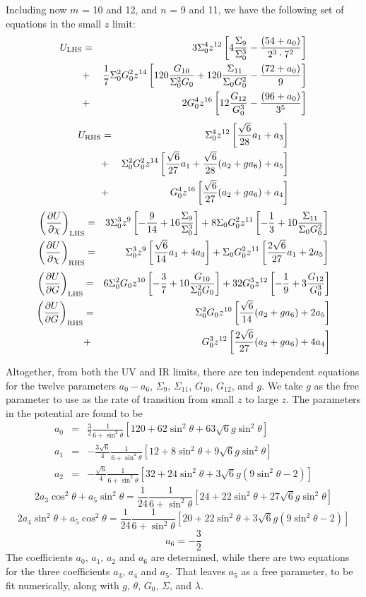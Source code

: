 \documentclass[aps,prd,12pt,nofootinbib]{revtex4}
\newcommand{\be}{\begin{equation}}
\newcommand{\ee}{\end{equation}}
\newcommand{\ba}{\begin{eqnarray}}
\newcommand{\ea}{\end{eqnarray}}
\def\rt6{\sqrt{6}}
\begin{document}
Including now $m$ = 10 and 12, and $n$ = 9 and 11, we have the following set of equations in the small $z$ limit:
\ba
U_{\rm LHS} &=& 3 \Sigma_0^4 z^{12} \left[ 4 \frac{\Sigma_9}{\Sigma_0^3} - \frac{(54+a_0)}{2^3 \cdot 7^2} \right] \nonumber \\
&+& \frac{1}{7} \Sigma_0^2 G_0^2 z^{14} \left[ 120 \frac{G_{10}}{\Sigma_0^2 G_0} + 120 \frac{\Sigma_{11}}{\Sigma_0 G_0^2} - \frac{(72+a_0)}{9} \right] \nonumber \\
&+& 2G_0^4 z^{16} \left[ 12 \frac{G_{12}}{G_0^3} - \frac{(96+a_0)}{3^5} \right]
\ea
\ba
U_{\rm RHS} &=& \Sigma_0^4 z^{12} \left[  \frac{\rt6}{28} a_1 + a_3\right] \nonumber \\
&+& \Sigma_0^2 G_0^2 z^{14} \left[ \frac{\rt6}{27} a_1 + \frac{\rt6}{28} (a_2 + g a_6) + a_5 \right] \nonumber \\
&+& G_0^4 z^{16} \left[ \frac{\rt6}{27} (a_2 + g a_6) + a_4 \right]
\ea
\ba
\left(\frac{\partial U}{\partial \chi}\right)_{\rm LHS} &=& 3 \Sigma_0^3 z^9 \left[ -\frac{9}{14} + 16 \frac{\Sigma_9}{\Sigma_0^3} \right]+ 8 \Sigma_0 G_0^2 z^{11} \left[ - \frac{1}{3} + 10 \frac{\Sigma_{11}}{\Sigma_0 G_0^2} \right]\\
\left(\frac{\partial U}{\partial \chi}\right)_{\rm RHS} &=& \Sigma_0^3 z^9 \left[ \frac{\rt6}{14} a_1 + 4 a_3  \right]+ \Sigma_0 G_0^2 z^{11} \left[  \frac{2\rt6}{27} a_1 + 2 a_5 \right]
\ea
\ba
\left(\frac{\partial U}{\partial G}\right)_{\rm LHS} &=& 6 \Sigma_0^2 G_0 z^{10} \left[ -\frac{3}{7} + 10 \frac{G_{10}}{\Sigma_0^2 G_0} \right]
+ 32 G_0^3 z^{12} \left[ - \frac{1}{9} + 3 \frac{G_{12}}{G_0^3} \right] \\
\left(\frac{\partial U}{\partial G}\right)_{\rm RHS} &=& \Sigma_0^2 G_0 z^{10} \left[ \frac{\rt6}{14} (a_2 + g a_6) + 2a_5 \right] \\
&+& G_0^3 z^{12} \left[ \frac{2\rt6}{27}  (a_2 + g a_6) + 4a_4 \right]
\ea

Altogether, from both the UV and IR limits, there are ten independent equations for the twelve parameters $a_0 - a_6$, $\Sigma_9$, $\Sigma_{11}$, $G_{10}$, $G_{12}$, and $g$.  
We take $g$ as the free parameter to use as the rate of transition from small $z$ to large $z$.  
The parameters in the potential are found to be
\ba
a_0 &=&  \frac{3}{2} \frac{1}{6 + \sin^2 \theta}\left[ 120 + 62 \sin^2 \theta + 63 \rt6 g \sin^2 \theta \right] \\
a_1 &=&  -\frac{3\rt6}{4} \frac{1}{6 + \sin^2 \theta}\left[ 12 + 8 \sin^2 \theta + 9 \rt6 g \sin^2 \theta \right] \\
a_2 &=&  -\frac{\rt6}{4} \frac{1}{6 + \sin^2 \theta}\left[ 32 + 24 \sin^2 \theta + 3 \rt6 g(9 \sin^2 \theta - 2) \right]
\ea
\be
2 a_3 \cos^2 \theta + a_5 \sin^2 \theta = \frac{1}{24} \frac{1}{6 + \sin^2 \theta}\left[ 24 + 22 \sin^2 \theta + 27 \rt6 g \sin^2 \theta \right] 
\ee
\be
2 a_4 \sin^2 \theta + a_5 \cos^2 \theta = \frac{1}{24} \frac{1}{6 + \sin^2 \theta}\left[ 20 +22 \sin^2 \theta   +  3 \rt6 g (9 \sin^2 \theta -2) \right]
\ee
\be
a_6 = -\frac{3}{2}
\ee
The coefficients $a_0$, $a_1$, $a_2$ and $a_6$ are determined, while there are two equations for the three coefficients $a_3$, $a_4$ and $a_5$.  
That leaves $a_5$ as a free parameter, to be fit numerically, along with $g$, $\theta$, $G_0$, $\Sigma$, and $\lambda$.
\end{document}
